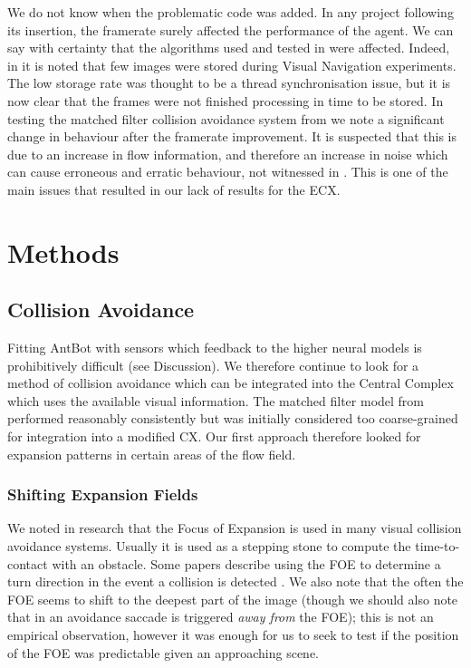 \documentclass[a4paper,11pt,twoside,openright]{article}
\let\oldsection\section
\def\section{\cleardoublepage\oldsection}
\begin{document}
 We do not know when the problematic code was added.  In any project
 following its insertion, the framerate surely affected the
 performance of the agent. We can say with certainty that the
 algorithms used and tested in \cite{Mitchell2018} were
 affected. Indeed, in \cite{Mitchell2018} it is noted that few images
 were stored during Visual Navigation experiments. The low storage
 rate was thought to be a thread synchronisation issue, but it is now
 clear that the frames were not finished processing in time to
 be stored.  In testing the matched filter collision avoidance system
 from \cite{Mitchell2018} we note a significant change in behaviour
 after the framerate improvement. It is suspected that this is due to
 an increase in flow information, and therefore an increase in noise
 which can cause erroneous and erratic behaviour, not witnessed in
 \cite{Mitchell2018}.  This is one of the main issues that resulted in
 our lack of results for the ECX.
\newpage

\section{ Methods } \label{sec:methods}
\subsection{ Collision Avoidance }
Fitting AntBot with sensors which feedback to the higher neural models
is prohibitively difficult (see Discussion). We therefore continue to
look for a method of collision avoidance which can be integrated into
the Central Complex which uses the available visual information. The
matched filter model from \cite{Mitchell2018} performed reasonably
consistently but was initially considered too coarse-grained for
integration into a modified CX. Our first approach therefore looked
for expansion patterns in certain areas of the flow field.

\subsubsection{ Shifting Expansion Fields }
We noted in research that the Focus of Expansion is used in many visual collision
avoidance systems. Usually it is used as a stepping stone to compute the
time-to-contact with an obstacle. Some papers describe using the FOE to determine
a turn direction in the event a collision is detected \cite{Stewart2010,
  Vanderstap2012}. We also note that the often the FOE seems to shift to the
deepest part of the image \cite{Vanderstap2012, Souhila2007} (though we should
also note that in \cite{Stewart2010} an avoidance saccade is triggered
\textit{away from} the FOE); this is not an empirical observation,
however it was enough for us to seek to test if the position of the
FOE was predictable given an approaching scene.
\newline
\par
\end{document}
